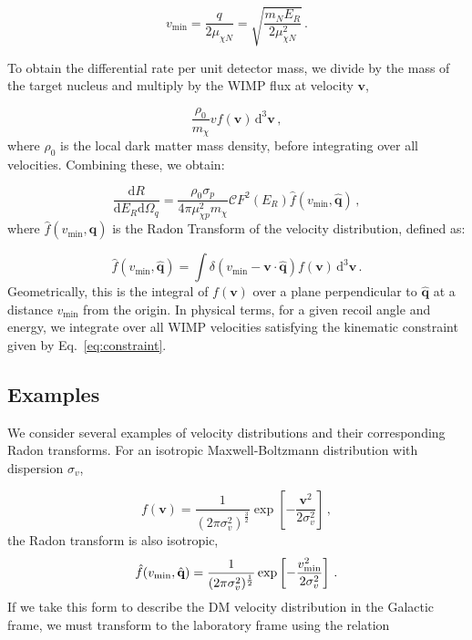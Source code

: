 \begin{equation}
v_\textrm{min} = \frac{q}{2\mu_{\chi N}} = \sqrt{\frac{m_N E_R}{2\mu_{\chi N}^2}}\,.
\end{equation}

To obtain the differential rate per unit detector mass, we divide by the mass of the target nucleus and multiply by the WIMP flux at velocity \(\textbf{v}\),

\begin{equation}
\frac{\rho_0}{m_\chi} v f(\textbf{v}) \, \textrm{d}^3 \textbf{v}\,,
\end{equation}
where \(\rho_0\) is the local dark matter mass density, before integrating over all velocities. Combining these, we obtain:

\begin{equation}
\frac{\textrm{d}R}{\textrm{d}E_R \textrm{d}\Omega_q} = \frac{\rho_0 \sigma_p}{4\pi \mu_{\chi p}^2 m_\chi} \mathcal{C} F^2(E_R) \hat{f}\left(v_\textrm{min},\hat{\textbf{q}}\right)\,,
\end{equation}
where \(\hat{f}\left(v_\textrm{min},\hat{\textbf{q}}\right)\) is the Radon Transform of the velocity distribution, defined as:

\begin{equation}
\hat{f}\left(v_\textrm{min},\hat{\textbf{q}}\right) = \int \delta\left(v_\textrm{min} - \textbf{v}\cdot\hat{\textbf{q}}\right) f(\textbf{v}) \,\textrm{d}^3\textbf{v}\,.
\end{equation}
Geometrically, this is the integral of \(f(\textbf{v})\) over a plane perpendicular to \(\hat{\textbf{q}}\) at a distance \(v_\textrm{min}\) from the origin. In physical terms, for a given recoil angle and energy, we integrate over all WIMP velocities satisfying the kinematic constraint given by Eq.\ \ref{eq:constraint}.

\subsection{Examples}

We consider several examples of velocity distributions and their corresponding Radon transforms. For an isotropic Maxwell-Boltzmann distribution with dispersion $\sigma_v$,

\begin{equation}
f(\textbf{v}) = \frac{1}{(2\pi \sigma_v^2)^{\frac{3}{2}}} \exp \left[ -\frac{\textbf{v}^2}{2 \sigma_v^2}\right]\,,
\end{equation}
the Radon transform is also isotropic,
\begin{equation}
\hat{f}(\vmin,\hat{\textbf{q}}) = \frac{1}{(2\pi \sigma_v^2)^{\frac{1}{2}}} \exp \left[ -\frac{\vmin^2}{2 \sigma_v^2}\right]\,.
\end{equation}
If we take this form to describe the DM velocity distribution in the Galactic frame, we must transform to the laboratory frame using the relation \cite{Gondolo:2002}

